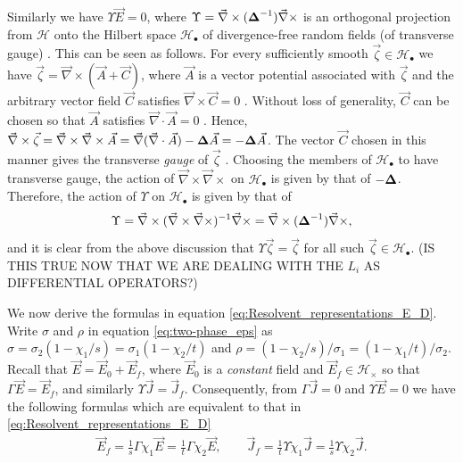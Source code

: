 \documentclass{cmslatex}
\newcommand\bDelta{\mbox{\boldmath${\Delta}$}}
\begin{document}
Similarly we have $\Upsilon\vec{E}=0$, where
$\Upsilon=\vec{\nabla}\times(\bDelta^{-1})\vec{\nabla}\times$ is an orthogonal projection from 
$\mathscr{H}$ onto the Hilbert space 
$\mathscr{H}_{\bullet}$ of divergence-free random fields (of transverse
gauge) \cite{Murphy:JMP:063506}. This can be seen as  
follows. For every sufficiently smooth $\vec{\zeta}\in\mathscr{H}_\bullet$ we have
$\vec{\zeta}=\vec{\nabla}\times(\vec{A}+\vec{C})$, where $\vec{A}$ is a vector
potential associated with $\vec{\zeta}$ and the arbitrary vector field
$\vec{C}$ satisfies $\vec{\nabla}\times\vec{C}=0$ \cite{Jackson-1999}. Without
loss of generality, $\vec{C}$ can be chosen so that $\vec{A}$
satisfies $\vec{\nabla}\cdot\vec{A}=0$ \cite{Jackson-1999}. Hence,
$\vec{\nabla}\times\vec{\zeta}=\vec{\nabla}\times\vec{\nabla}\times\vec{A}
=\vec{\nabla}(\vec{\nabla}\cdot\vec{A})-\bDelta\vec{A}=-\bDelta\vec{A}$. The vector 
$\vec{C}$ chosen in this manner gives the transverse \emph{gauge} of
$\vec{\zeta}$ \cite{Jackson-1999}. Choosing the members of 
$\mathscr{H}_\bullet$ to have transverse gauge, the action of
$\vec{\nabla}\times\vec{\nabla}\times$ on $\mathscr{H}_\bullet$ is given by that of
$-\bDelta$. Therefore, the action of $\Upsilon$ on $\mathscr{H}_\bullet$ is given
by that of 
%
\begin{align}\label{eq:GammaCurl}
  \Upsilon=\vec{\nabla}\times(\vec{\nabla}\times\vec{\nabla}\times)^{-1}\vec{\nabla}\times
  =\vec{\nabla}\times(\bDelta^{-1})\vec{\nabla}\times, 
\end{align}
%
and it is clear from the above discussion that $\Upsilon\vec{\zeta}=\vec{\zeta}$ for
all such $\vec{\zeta}\in\mathscr{H}_\bullet$.
(IS THIS TRUE NOW THAT WE ARE DEALING WITH THE $L_i$ AS DIFFERENTIAL
OPERATORS?) 





We now derive the formulas in equation
\eqref{eq:Resolvent_representations_E_D}.
Write $\sigma$ and $\rho$ in 
equation \eqref{eq:two-phase_eps} as $\sigma=\sigma_2(1-\chi_1/s)=\sigma_1(1-\chi_2/t)$ and
$\rho=(1-\chi_2/s)/\sigma_1=(1-\chi_1/t)/\sigma_2$. Recall that
$\vec{E}=\vec{E}_0+\vec{E}_f$, where $\vec{E}_0$ is a \emph{constant}
field and $\vec{E}_f\in\mathscr{H}_\times$ so that
$\Gamma\vec{E}=\vec{E}_f$, and similarly
$\Upsilon\vec{J}=\vec{J}_f$. Consequently, from $\Gamma\vec{J}=0$ and $\Upsilon\vec{E}=0$
we have the following formulas which are equivalent to that in 
\eqref{eq:Resolvent_representations_E_D}  
% 
\begin{align}\label{eq:Proj_rep_Ef_Jf}
  \vec{E}_f=\frac{1}{s}\Gamma\chi_1\vec{E}=\frac{1}{t}\Gamma\chi_2\vec{E}, \qquad
  \vec{J}_f=\frac{1}{t}\Upsilon\chi_1\vec{J}=\frac{1}{s}\Upsilon\chi_2\vec{J}.
\end{align}
%
\end{document}
